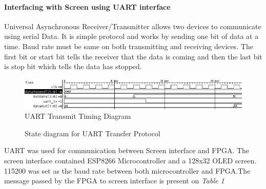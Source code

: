 \documentclass[a4paper,12pt]{article}
\begin{document}
    \paragraph{Interfacing with Screen using UART interface} 

    \phantom{text}

    Universal Asynchronous Receiver/Transmitter allows two devices to communicate using serial Data. It is simple protocol and works by sending one bit of data at a time. Baud rate must be same on both transmitting and receiving devices. The first bit or start bit tells the receiver that the data is coming and then the last bit is stop bit which tells the data has stopped.



    \begin{figure}
        \centering
        \includegraphics[width=1\textwidth ]{./images/uart_timing.png}
        \caption{UART Transmit Timing Diagram}
    \end{figure}

    \begin{figure}[H]
    \caption{State diagram for UART Transfer Protocol} 
    \end{figure}

    UART was used for communication between Screen interface and FPGA. The screen interface contained  ESP8266 Microcontroller and a 128x32 OLED screen. 115200 was set as the baud rate between both microcontroller and FPGA.The message passed by the FPGA to screen interface is present on  \textit{Table 1} 
\end{document}
